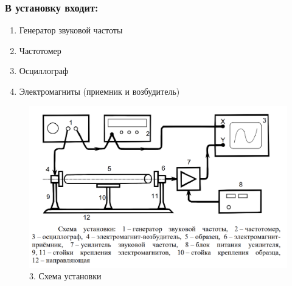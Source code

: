\documentclass[xcolor=table]{beamer}
\begin{document}
\begin{frame}
\frametitle{В установку входит:}
\begin{enumerate}
    \footnotesize
    \item Генератор звуковой частоты
    \item Частотомер
    \item Осциллограф
    \item Электромагниты (приемник и возбудитель)
\end{enumerate}
\begin{figure}
    \centering
    \includegraphics[scale=0.5]{images/scheme.png}
    \caption{3. Схема установки}
    \label{fig:my_label}
\end{figure}
\end{frame}

\end{document}
